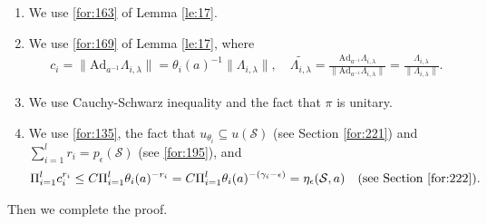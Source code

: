 \documentclass[11 pt]{amsart}
\theoremstyle{definition}
\numberwithin{equation}{section}
\begin{document}
\begin{enumerate}
  \item [(i)] We use \eqref{for:163} of Lemma \ref{le:17}.
  \item [(ii)] We use \eqref{for:169}  of Lemma \ref{le:17}, where
\begin{align*}
 c_i=\|\text{Ad}_{a^{-1}}\Lambda_{i,\lambda}\|=\theta_i(a)^{-1}\|\Lambda_{i,\lambda}\|,\quad \widetilde{\Lambda_{i,\lambda}}=\frac{\text{Ad}_{a^{-1}}\Lambda_{i,\lambda}}{\|\text{Ad}_{a^{-1}}\Lambda_{i,\lambda}\|}=\frac{\Lambda_{i,\lambda}}{\|\Lambda_{i,\lambda}\|}.
\end{align*}
  \item [(iii)] We use Cauchy-Schwarz inequality and the fact that $\pi$ is unitary.
  \item [(vi)] We use \eqref{for:135}, the fact that $u_{\theta_i}\subseteq u(\mathcal{S})$ (see Section \ref{for:221}) and $\sum_{i=1}^lr_i=p_{\epsilon}(\mathcal{S})$ (see \eqref{for:195}), and
\begin{align*}
 \Pi_{i=1}^lc_i^{r_i}\leq C\Pi_{i=1}^l \theta_i(a)^{-r_i} =C\Pi_{i=1}^l \theta_i(a)^{-(\gamma_i-\epsilon)}=\eta_\epsilon(\mathcal{S}, a)\quad\text{(see Section \ref{for:222})}.
\end{align*}
\end{enumerate}
 Then we complete the proof.
\end{document}
